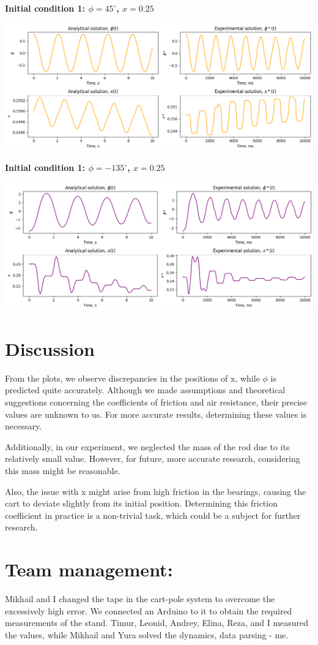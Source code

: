 \documentclass{article}
\begin{document}
\textbf{Initial condition 1: $\phi = 45^\circ$, $x = 0.25$}

\includegraphics*[scale=0.45]{plots/res_comparison_init2.png}


\textbf{Initial condition 1: $\phi = -135^\circ$, $x = 0.25$}

\includegraphics*[scale=0.45]{plots/res_comparison_init3.png}

\section{Discussion}

From the plots, we observe discrepancies in the positions of x, while $\phi$ is predicted quite accurately. Although we made assumptions and theoretical suggestions concerning the coefficients of friction and air resistance, their precise values are unknown to us. For more accurate results, determining these values is necessary. 

Additionally, in our experiment, we neglected the mass of the rod due to its relatively small value. However, for future, more accurate research, considering this mass might be reasonable.

Also, the issue with x might arise from high friction in the bearings, causing the cart to deviate slightly from its initial position. Determining this friction coefficient in practice is a non-trivial task, which could be a subject for further research.

\section{Team management:} Mikhail and I changed the tape in the cart-pole system to overcome the excessively high error. We connected an Arduino to it to obtain the required measurements of the stand. Timur, Leonid, Andrey, Elina, Reza, and I measured the values, while Mikhail and Yura solved the dynamics, data parsing - me.
\end{document}
